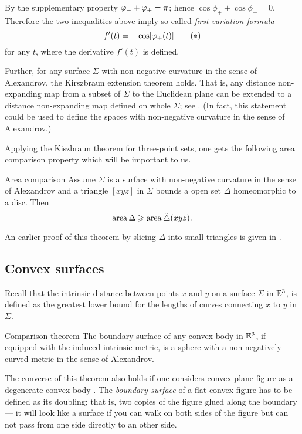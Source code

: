 \documentclass[oneside,a4paper, 12pt]{article}
\begin{document}
By the supplementary property $\phi_-\z+\phi_+=\pi$;
hence $\cos\phi_+ +\cos\phi_-=0$.
Therefore the two inequalities above imply so called \emph{first variation formula}
\begin{equation}
	\label{eq:first variation}
f'(t)=-\cos[\phi_+(t)]
	\tag{${*}$}
\end{equation}
for any $t$, where the derivative $f'(t)$ is defined.

Further, for any surface $\Sigma$ with non-negative curvature in the sense of Alexandrov,
the Kirszbraun extension theorem holds.
That is, any distance non-expanding map from a subset of $\Sigma$ to the Euclidean plane can be extended to a distance non-expanding map defined on whole $\Sigma$;
see \cite{lang1997kirszbraun, alexander2011alexandrov}.
(In fact, this statement could be used to define the spaces with non-negative curvature in the sense of Alexandrov.)

Applying the Kiszbraun theorem for three-point sets,
one gets the following area comparison property which will be important to us.

\begin{thm}{Area comparison}\label{Area comparison}
Assume $\Sigma$ is a surface with non-negative curvature in the sense of Alexandrov
and a triangle $[xyz]$ in $\Sigma$ bounds a open set $\Delta$ homeomorphic to a disc.
Then 
\[\mathop{\rm area}\nolimits\Delta\geqslant \mathop{\rm area}\nolimits\tilde\triangle(xyz).\]
\end{thm}
An earlier proof of this theorem by slicing $\Delta$ into small triangles is given in \cite[X \S 1]{ aleksandrov1948vnutrennnyaya}.

\subsection*{Convex surfaces}

Recall that the intrinsic distance between points $x$ and $y$ on a surface $\Sigma$ in $\mathbb{E}^3$, is defined as the  greatest lower bound for the lengths of curves connecting $x$ to $y$ in $\Sigma$.

\begin{thm}{Comparison theorem}\label{Comparison theorem}
The boundary surface of any convex body in $\mathbb{E}^3$,
if equipped with the induced intrinsic metric, 
is a sphere with a non-negatively curved metric in the sense of Alexandrov.
\end{thm}

The converse of this theorem also holds
if one considers convex plane figure as a degenerate convex body \cite[III \S 3]{aleksandrov1948vnutrennnyaya}.
The \emph{boundary surface} of a flat convex figure has to be defined as its doubling;
that is, two copies 
of the figure glued along the boundary --- 
it will look like a surface if you can walk on both sides of the figure but can not pass from one side directly to an other side.
\end{document}
